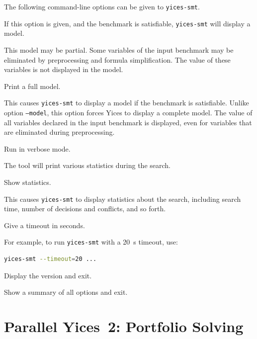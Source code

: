 \documentclass[11pt,twoside,fleqn,openright,titlepage]{cslreport}
\newenvironment{options}{
\begin{list}{}{
\setlength{\labelsep}{1.8ex}
\setlength{\labelwidth}{0pt}
\setlength{\itemindent}{-0.5\leftmargin}
\settowidth{\leftmargin}{\texttt{--}}
\renewcommand{\makelabel}{\optionlabel}}}
{\end{list}}
\newcommand*\optionlabel[1]{\hspace\labelsep\texttt{#1}}
\begin{document}
The following command-line options can be given to \texttt{yices-smt}.
\begin{options}
\item[--model, -m] If this option is given, and the benchmark
  is satisfiable, \texttt{yices-smt} will display a model.

  This model may be partial. Some variables of the input benchmark may
  be eliminated by preprocessing and formula simplification. The value
  of these variables is not displayed in the model.

\item[--full-model, -f] Print a full model.

  This causes \texttt{yices-smt} to display a model if the benchmark
  is satisfiable. Unlike option \texttt{--model}, this option forces
  Yices to display a complete model. The value of all variables
  declared in the input benchmark is displayed, even for variables
  that are eliminated during preprocessing.

\item[--verbose, -v] Run in verbose mode.

  The tool will print various statistics during the search.

\item[--stats, -s] Show statistics.

  This causes \texttt{yices-smt} to display statistics about the
  search, including search time, number of decisions and conflicts,
  and so forth.

\item[--timeout=<int>, -t <int>] Give a timeout in seconds.

  For example, to run \texttt{yices-smt} with a 20~s timeout, use:
  \begin{small}
  \begin{lstlisting}[language=sh]
     yices-smt --timeout=20 ...
  \end{lstlisting}
  \end{small}
\item[--version, -V] Display the version and exit.

\item[--help, -h] Show a summary of all options and exit.
\end{options}


\section{Parallel Yices~2: Portfolio Solving}
\end{document}
